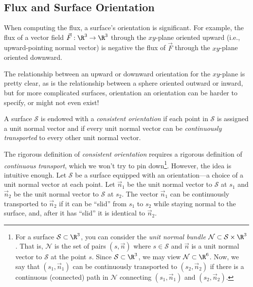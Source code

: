 \subsection{Flux and Surface Orientation}

When computing the flux, a surface's orientation is significant.
For example, the flux of a vector field $\vec F:\R^3\to\R^3$ through
the $xy$-plane oriented upward (i.e., upward-pointing normal vector)
is negative the flux of $\vec F$
through the $xy$-plane oriented downward.

The relationship between an upward or downward orientation for
the $xy$-plane is pretty clear, as is the relationship between a sphere
oriented outward or inward, but for more complicated surfaces, orientation
an orientation can be harder to specify, or might not even exist!

\begin{definition}
	A surface $\mathcal S$ is endowed with a \emph{consistent orientation}
	if each point in $\mathcal S$ is assigned a unit normal vector and
	if every unit normal vector can be \emph{continuously transported} to every
	other unit normal vector.
\end{definition}

The rigorous definition of \emph{consistent orientation} requires a rigorous
definition of \emph{continuous transport}, which we won't try to pin down\footnote{
	For a surface $\mathcal S\subset \R^3$, you can consider the
	\emph{unit normal bundle} $\mathcal N\subset \mathcal S\times \R^3$.  That is,
	$\mathcal N$ is the set of pairs $(s,\vec n)$ where $s\in\mathcal S$ and
	$\vec n$ is a unit normal vector to $\mathcal S$ at the point $s$.  Since
	$\mathcal S\subset \R^3$, we may view $\mathcal N\subset \R^6$.  Now, we say
	that $(s_1,\vec n_1)$ can be continuously transported to $(s_2,\vec n_2)$ if
	there is a continuous (connected) path in $\mathcal N$ connecting $(s_1,\vec n_1)$ and 
	$(s_2,\vec n_2)$.
}.  However,
the idea is intuitive enough.  Let $\mathcal S$
be a surface equipped with an orientation---a choice of a unit normal vector
at each point.  Let $\vec n_1$ be the unit normal vector to $\mathcal S$ at $s_1$
and $\vec n_2$ be the unit normal vector to $\mathcal S$ at $s_2$.  The vector $\vec n_1$
can be continuously transported to $\vec n_2$ if it can be ``slid'' from $s_1$ to $s_2$ while
staying normal to the surface, and, after it has ``slid'' it is identical to $\vec n_2$.

